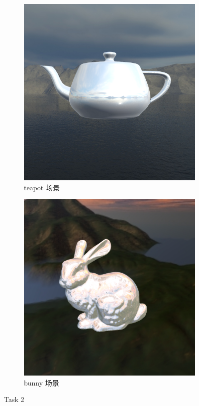 \documentclass[UTF8]{ctexart}
\begin{document}
\begin{figure}[htbp]
    \begin{subfigure}[b]{0.49\textwidth}
        \centering
        \includegraphics[width=\textwidth]{images/2-1.png}
        \caption{teapot 场景}
    \end{subfigure}
    \hfill
    \begin{subfigure}[b]{0.49\textwidth}
        \centering
        \includegraphics[width=\textwidth]{images/2-2.png}
        \caption{bunny 场景}
    \end{subfigure}
    \caption*{Task 2}
\end{figure}
\end{document}
